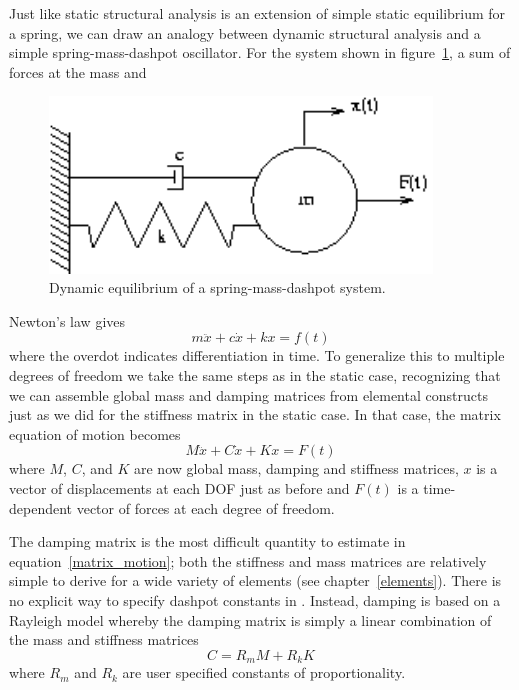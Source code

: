 Just like static structural analysis is an extension of simple static
equilibrium for a spring, we can draw an analogy between dynamic structural
analysis and a simple spring-mass-dashpot oscillator.  For the system
shown in figure~\ref{spring_mass}, a sum of forces at the mass and
%
\begin{figure}
 \begin{center}
  \includegraphics[width=4in]{figures/spring_mass}
 \end{center}
 \caption{Dynamic equilibrium of a spring-mass-dashpot system.}
 \label{spring_mass}
\end{figure} 
%
Newton's law gives
\begin{equation}
{m {\ddot x} + c {\dot x} + k x} = f(t)
\end{equation}
where the overdot indicates differentiation in time.  To generalize this
to multiple degrees of freedom we take the same steps as in the static
case, recognizing that we can assemble global mass and damping matrices
from elemental constructs just as we did for the stiffness matrix in the
static case.  In that case, the matrix equation of motion becomes
\begin{equation}
{M {\ddot x} + C {\dot x} + K x} = F(t)
\label{matrix_motion}
\end{equation}
where $M$, $C$, and $K$ are now global mass, damping and stiffness matrices,
$x$ is a vector of displacements at each DOF just as before and $F(t)$
is a time-dependent vector of forces at each degree of freedom.

The damping matrix is the most difficult quantity to estimate in 
equation~\ref{matrix_motion}; both the stiffness and mass matrices are
relatively simple to derive for a wide variety of elements (see 
chapter~\ref{elements}).  There is no explicit way to specify dashpot
constants in \felt{}.  Instead, damping is based on a Rayleigh model
whereby the damping matrix is simply a linear combination of the
mass and stiffness matrices
\begin{equation}
C = {R_{m} M + R_{k} K} 
\end{equation}
where $R_m$ and $R_k$ are user specified constants of proportionality.

